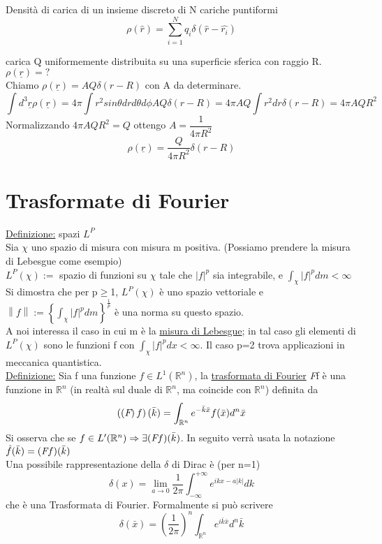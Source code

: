 \documentclass[a4paper,11pt]{report}
\newcommand{\R}{\mathbb{R}}
\newcommand{\Rn}{\mathbb{R}^n}
\newcommand{\fourier}{\emph{F}}
\newcommand{\x}{\bar{x}}
\newcommand{\kk}{\bar{k}}
\begin{document}
Densità di carica di un insieme discreto di N cariche puntiformi
\begin{equation}
\rho(\hat{r}) = \sum_{i=1}^{N} q_i\delta(\hat{r}-\hat{r_i})
\end{equation}

carica Q uniformemente distribuita su una superficie sferica con raggio R. $\rho(\underline{r})=?$\\
Chiamo $\rho(\underline{r})=A Q\delta(r-R)$ con A da determinare.
$$\int d^3\underline{r}\rho(\underline{r})= 4\pi \int r^2 sin\theta dr d\theta d\phi A Q \delta(r-R) = 4\pi AQ \int r^2 dr \delta(r-R)=4\pi AQR^2 $$
Normalizzando $4\pi AQR^2 =Q$ ottengo $A=\dfrac{1}{4\pi R^2}$
$$ \rho(\underline{r})=\dfrac{Q}{4\pi R^2}\delta(r-R)$$

\section{Trasformate di Fourier}
\underline{Definizione:} spazi $L^P$ \\
Sia $\chi$ uno spazio di misura con misura m positiva. (Possiamo prendere la misura di Lebesgue come esempio)\\
$L^P(\chi):=$ spazio di funzioni su $\chi$ tale che $|f|^p$ sia integrabile, e $\int_{\chi}|f|^p dm < \infty$\\
Si dimostra che per p$\geq$1, $L^P(\chi)$ è uno spazio vettoriale e $\left\|f\right\| := \left\{ \int_{\chi} |f|^p dm\right\}^{\frac{1}{p}}$ è una norma su questo spazio.\\
A noi interessa il caso in cui m è la \underline{misura di Lebesgue}; in tal caso gli elementi di $L^P(\chi)$ sono le funzioni f con $\int_{\chi}|f|^p dx < \infty$.
Il caso p=2 trova applicazioni in meccanica quantistica.\\
\underline{Definizione:} Sia f una funzione $f\in L^1 (\Rn)$, la \underline{trasformata di Fourier} \fourier f è una funzione in $\Rn$ (in realtà sul duale di $\R^n$, ma coincide con $\R^n$) definita da 
\begin{equation}
\left(\left(\fourier \right)f\right)(\kk) = \int_{\Rn}e^{-\bar{k}\bar{x}}f(\bar{x})d^n\bar{x} 
\end{equation}
Si osserva che se $f\in L'(\Rn) \Rightarrow \exists (\fourier f)(\bar{k})$. In seguito verrà usata la notazione $\hat{f}(\bar{k})=(\fourier f)(\bar{k})$\\
Una possibile rappresentazione della $\delta$ di Dirac è (per n=1)
$$
	\delta(x)=\lim_{a \to 0} \dfrac{1}{2\pi} \int_{-\infty}^{+\infty} e^{ikx-a\left | k\right |}dk
$$
che è una Trasformata di Fourier. Formalmente si può scrivere
\begin{equation}
\delta(\x)=\left(\dfrac{1}{2\pi}\right)^n\int_{\Rn}e^{i\kk\x}d^n\kk
\end{equation}
\end{document}

